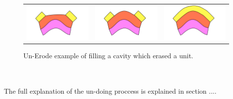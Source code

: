\documentclass[12pt, a4paper]{report} %
\begin{document}
\begin{figure}[htb]
\centering
\begin{tabular}{@{}ccc@{}}
\includegraphics[width=.35\textwidth]{unErodeConvexDescription0.png}&
\includegraphics[width=.35\textwidth]{unErodeConvexDescription1.png}&
\includegraphics[width=.35\textwidth]{unErodeConvexDescription2.png}\\
\end{tabular}
\caption{Un-Erode example of filling a cavity which erased a unit.}
\label{unerodecveg}
\end{figure}\\\\
The full explanation of the un-doing proccess is explained in section ....
\end{document}
